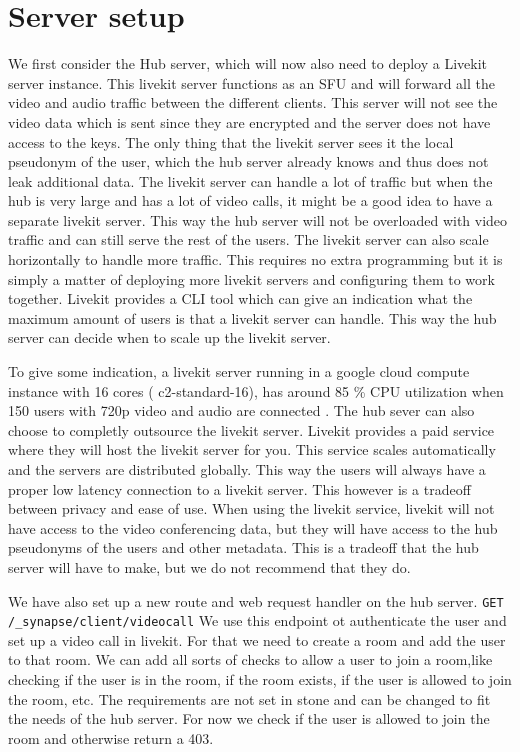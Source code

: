 \documentclass{report}
\begin{document}
    \section{Server setup}
    We first consider the Hub server, which will now also need to deploy a Livekit server instance. This livekit server
    functions as an SFU and will forward all the video and audio traffic between the different clients. This server will
    not see the video data which is sent since they are encrypted and the server does not have access to the keys. The
    only thing that the livekit server sees it the local pseudonym of the user, which the hub server already knows and
    thus does not leak additional data. The livekit server can handle a lot of traffic but when the hub is very large
    and has a lot of video calls, it might be a good idea to have a separate livekit server. This way the hub server
    will not be overloaded with video traffic and can still serve the rest of the users. The livekit server can also
    scale horizontally to handle more traffic. This requires no extra programming but it is simply a matter of deploying
    more livekit servers and configuring them to work together. Livekit provides a CLI tool which can give an
    indication what the maximum amount of users is that a livekit server can handle. This way the hub server can decide
    when to scale up the livekit server.

    To give some indication, a livekit server running in a google cloud compute instance with 16 cores (
    c2-standard-16), has around 85 \% CPU utilization when 150 users with 720p video and audio are connected
    \cite{noauthor_benchmarking_nodate}. The hub sever can also choose to completly outsource the livekit server.
    Livekit provides a paid service where they will host the livekit server for you. This service scales
    automatically and the servers are distributed globally. This way the users will always have a proper low
    latency connection to a livekit server. This however is a tradeoff between privacy and ease of use. When using
    the livekit service, livekit will not have access to the video conferencing data, but they will have access to
    the hub pseudonyms of the users and other metadata. This is a tradeoff that the hub server will have to make,
    but we do not recommend that they do.

    We have also set up a new route and web request handler on the hub server.
    \texttt{GET /\_synapse/client/videocall} We use this endpoint ot authenticate the user and set up a video call
    in livekit. For that we need to create a room and add the user to that room. We can add all sorts of checks to allow
    a user to join a room,like checking if the user is in the room, if the room exists, if the user is allowed to
    join the room, etc. The requirements are not set in stone and can be changed to fit the needs of the hub server.
    For now we check if the user is allowed to join the room and otherwise return a 403.
\end{document}
